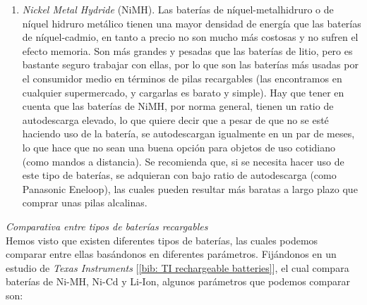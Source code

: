 \documentclass[12pt]{article}
\begin{document}
\begin{enumerate}
		\item \textit{Nickel Metal Hydride} (NiMH). Las baterías de níquel-metalhidruro o de níquel hidruro metálico tienen una mayor densidad de energía que las baterías de níquel-cadmio, en tanto a precio no son mucho más costosas y no sufren el efecto memoria. Son más grandes y pesadas que las baterías de litio, pero es bastante seguro trabajar con ellas, por lo que son las baterías más usadas por el consumidor medio en términos de pilas recargables (las encontramos en cualquier supermercado, y cargarlas es barato y simple). Hay que tener en cuenta que las baterías de NiMH, por norma general, tienen un ratio de autodescarga elevado, lo que quiere decir que a pesar de que no se esté haciendo uso de la batería, se autodescargan igualmente en un par de meses, lo que hace que no sean una buena opción para objetos de uso cotidiano (como mandos a distancia). Se recomienda que, si se necesita hacer uso de este tipo de baterías, se adquieran con bajo ratio de autodescarga (como Panasonic Eneloop), las cuales pueden resultar más baratas a largo plazo que comprar unas pilas alcalinas.
		
	\end{enumerate}
	
	\noindent \textit{Comparativa entre tipos de baterías recargables} \\
	
	\noindent Hemos visto que existen diferentes tipos de baterías, las cuales podemos comparar entre ellas basándonos en diferentes parámetros. Fijándonos en un estudio de \textit{Texas Instruments} [\ref{bib: TI rechargeable batteries}], el cual compara baterías de Ni-MH, Ni-Cd y Li-Ion, algunos parámetros que podemos comparar son:
	
\end{document}
